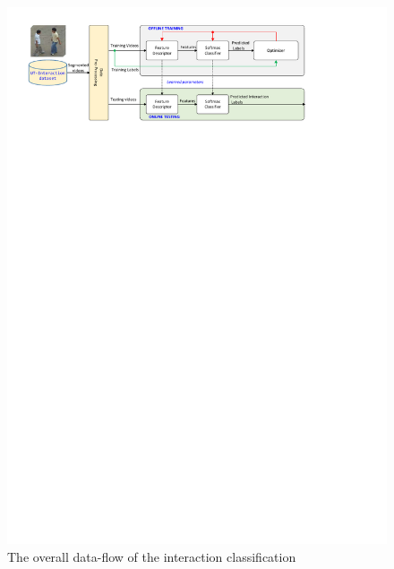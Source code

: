 \begin{figure}
	\includegraphics[trim=1cm 23cm 0cm 1cm]{fig01/dataflow_classifier.pdf}
	\caption{The overall data-flow of the interaction classification}
	\label{fig:df_classifier}
\end{figure}

